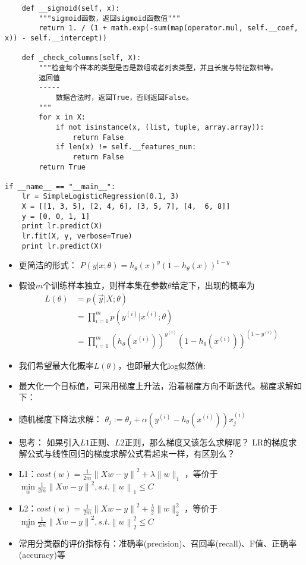 \documentclass[10pt,a4paper]{ctexbook}
\begin{document}
\begin{verbatim}
    def __sigmoid(self, x):
        """sigmoid函数，返回sigmoid函数值"""
        return 1. / (1 + math.exp(-sum(map(operator.mul, self.__coef, x)) - self.__intercept))

    def _check_columns(self, X):
        """检查每个样本的类型是否是数组或者列表类型，并且长度与特征数相等。
        返回值
        -----
            数据合法时，返回True，否则返回False。
        """
        for x in X:
            if not isinstance(x, (list, tuple, array.array)):
                return False
            if len(x) != self.__features_num:
                return False
        return True

if __name__ == "__main__":
    lr = SimpleLogisticRegression(0.1, 3)
    X = [[1, 3, 5], [2, 4, 6], [3, 5, 7], [4,  6, 8]]
    y = [0, 0, 1, 1]
    print lr.predict(X)
    lr.fit(X, y, verbose=True)
    print lr.predict(X)
\end{verbatim}



\begin{itemize}
\item 更简洁的形式： $P(y|x;\theta)={h_{\theta}(x)}^y(1-h_{\theta}(x))^{1-y}$
\item 假设$m$个训练样本独立，则样本集在参数${\theta}$给定下，出现的概率为
\begin{align*}
L(\theta)&=p(\vec y|X;\theta)\\
         &=\prod_{i=1}^{m}{p(y^{(i)} | x^{(i)};\theta)}\\
         &=\prod_{i=1}^{m}{(h_{\theta}(x^{(i)}))^{y^{(i)}}(1-h_{\theta}(x^{(i)}))^{(1-y^{(i)})}}
\end{align*}

\item 我们希望最大化概率$L({\theta})$，也即最大化log似然值:

\item 最大化一个目标值，可采用梯度上升法，沿着梯度方向不断迭代。梯度求解如下：

\item 随机梯度下降法求解：
\subitem ${\theta}_{j}:={\theta}_{j}+{\alpha}(y^{(i)}-h_{\theta}(x^{(i)}))x_{j}^{(i)}$

\item 思考：
\subitem 如果引入$L1$正则、$L2$正则，那么梯度又该怎么求解呢？
\subitem LR的梯度求解公式与线性回归的梯度求解公式看起来一样，有区别么？

\item L1：$cost(w)={\frac {1}{2m}}\left\|{Xw-y}\right\|^{2}+\lambda\|w\|_{1}$
，等价于
    $\min\limits_{w}{\frac {1}{2m}}\left\|{Xw-y}\right\|^{2}, s.t. \left\|w\right\|_{1}\le{C}$

\item L2：$cost(w)={\frac {1}{2m}}\left\|{Xw-y}\right\|^{2}+{\frac {\lambda}{2}}\|w\|_{2}^{2}$
，等价于
    $\min\limits_{w}{\frac {1}{2m}}\left\|{Xw-y}\right\|^{2}, s.t. \left\|w\right\|_{2}^{2}\le{C}$

\item 常用分类器的评价指标有：准确率(precision)、召回率(recall)、F值、正确率(accuracy)等
\end{itemize}
\end{document}
